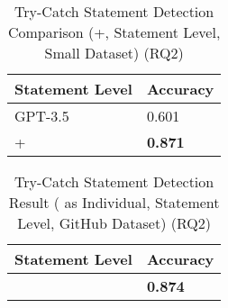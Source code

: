 
\begin{table}[t]%
  \caption{Try-Catch Statement Detection Comparison ({\xblock}+{\xstate}, Statement Level, Small Dataset) (RQ2)}
  \vspace{-12pt}
  \small
	\begin{center}
		\renewcommand{\arraystretch}{1}
		\begin{tabular}{| p{3.05cm}<{\centering} | p{1.2cm}<{\centering}|}
		  \hline
		Statement Level	  & Accuracy \\
			\hline
                        GPT-3.5 & 0.601  \\
			\hline
			\xblock + \xstate   & \textbf{0.871} \\
			\hline
		\end{tabular}
		\label{tab:xstate-3}
	\end{center}
\end{table}

\begin{table}[t]%
\caption{Try-Catch Statement Detection Result ({\xstate} as Individual, Statement Level, GitHub Dataset) (RQ2)}
  \vspace{-12pt}
  \small
	\begin{center}
		\renewcommand{\arraystretch}{1}
		\begin{tabular}{| p{3.05cm}<{\centering} | p{1.2cm}<{\centering}|}
		  \hline
		Statement Level	  & Accuracy\\
			\hline
			\hline
			\xstate  & \textbf{0.874}  \\
			\hline
		\end{tabular}
		\label{tab:xstate-4}
	\end{center}
\end{table}

